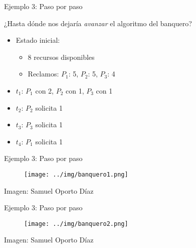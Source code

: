 \documentclass[presentation]{beamer}
\begin{document}
\begin{frame}[label={sec:orgd46cb24}]{Ejemplo 3: Paso por paso}
\begin{center}
¿Hasta dónde nos dejaría \emph{avanzar} el algoritmo del banquero?
\end{center}
\begin{itemize}
\item Estado inicial:
\begin{itemize}
\item 8 recursos disponibles
\item Reclamos: \(P_1\): 5, \(P_2\): 5, \(P_3\): 4
\end{itemize}
\item \(t_1\): \(P_1\) con 2, \(P_2\) con 1, \(P_3\) con 1
\item \(t_2\): \(P_2\) solicita 1
\item \(t_3\): \(P_3\) solicita 1
\item \(t_4\): \(P_1\) solicita 1
\end{itemize}
\end{frame}

\begin{frame}[label={sec:org8ca7957}]{Ejemplo 3: Paso por paso}
\begin{figure}[htbp]
\centering
\texttt{[image: ../img/banquero1.png]}
\end{figure}

\begin{center}
{\scriptsize Imagen: Samuel Oporto Díaz }
\end{center}
\end{frame}

\begin{frame}[label={sec:orgd5afd53}]{Ejemplo 3: Paso por paso}
\begin{figure}[htbp]
\centering
\texttt{[image: ../img/banquero2.png]}
\end{figure}

\begin{center}
{\scriptsize Imagen: Samuel Oporto Díaz }
\end{center}
\end{frame}
\end{document}
